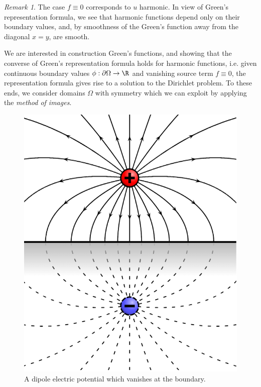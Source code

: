 \documentclass[reqno]{amsart}
\theoremstyle{definition}
\theoremstyle{remark}
\newtheorem*{remark}{Remark}
\begin{document}
\begin{remark}
	The case $f \equiv 0$ corresponds to $u$ harmonic. In view of Green's representation formula, we see that harmonic functions depend only on their boundary values, and, by smoothness of the Green's function away from the diagonal $x = y$, are smooth. 
\end{remark}

We are interested in construction Green's functions, and showing that the converse of Green's representation formula holds for harmonic functions, i.e. given continuous boundary values $\phi : \partial \Omega \to \R$ and vanishing source term $f \equiv 0$, the representation formula gives rise to a solution to the Dirichlet problem. To these ends, we consider domains $\Omega$ with symmetry which we can exploit by applying the \textit{method of images}. 
\begin{figure}[h]
	\begin{center}
		\includegraphics[scale = 0.3]{reflection}
		\caption{A dipole electric potential which vanishes at the boundary.}
	\end{center}
\end{figure}
\end{document}
